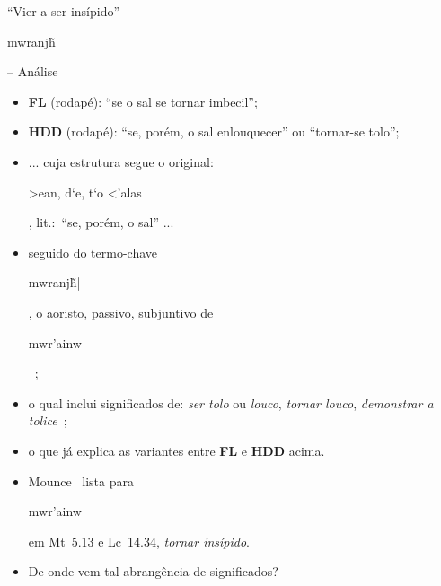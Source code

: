 \documentclass[12pt,aspectratio=169]{beamer}
\newcommand{\YEL}[1]{{\textcolor{TXyel}{#1}}}
\newcommand{\GRE}[1]{{\textcolor{TXgre}{#1}}}
\newcommand{\CYA}[1]{{\textcolor{TXcya}{#1}}}
\newcommand{\MAG}[1]{{\textcolor{TXmag}{#1}}}
\newcommand{\BRI}[1]{{\textcolor{BSpbg}{#1}}}   %
\newcommand{\GRtxt}[1]{\begin{otherlanguage}{greek}{{#1}}\end{otherlanguage}}
\begin{document}
    \begin{frame}{\BRI{``Vier a ser insípido''} -- \BRI{\GRtxt{mwranj\~h|}} -- \BRI{Análise}}
        \begin{itemize}
            \item<1-> \BRI{\textbf{FL}} (rodapé): \MAG{``se o sal se tornar imbecil''};
                \\[\medskipamount]
            \item<2-> \BRI{\textbf{HDD}} (rodapé): \MAG{``se, porém, o sal enlouquecer''} ou
                \MAG{``tornar-se tolo''};
                \\[\medskipamount]
            \item<3-> ... cuja estrutura segue o original: \YEL{\GRtxt{>ean, d`e, t`o <'alas}},
                lit.:~\MAG{``se, porém, o sal''} ...
                \\[\medskipamount]
            \item<4-> seguido do termo-chave \YEL{\GRtxt{mwranj\~h|}}, o \GRE{aoristo},
                \GRE{passivo}, \GRE{subjuntivo} de
                \YEL{\GRtxt{mwr'ainw}}~\cite{2013-MounceWD-VidaNova,
                2007-FribergB+FribergT-VidaNova, 2009-MounceWD-Vida}; %
                \\[\medskipamount]
            \item<5-> o qual inclui significados de: \CYA{\textit{ser tolo} ou \textit{louco}},
                \CYA{\textit{tornar louco}}, \CYA{\textit{demonstrar a
                tolice}}~\cite{2013-MounceWD-VidaNova};
                \\[\medskipamount]
            \item<6-> o que já explica as variantes entre \BRI{\textbf{FL}} e \BRI{\textbf{HDD}}
                acima.
                \\[\medskipamount]
            \item<7-> \BRI{Mounce}~\cite{2013-MounceWD-VidaNova} lista para
                \YEL{\GRtxt{mwr'ainw}} em \BRI{Mt~5.13} e \BRI{Lc~14.34}, \CYA{\textit{tornar
                insípido}}.
                \\[\medskipamount]
            \item<8-> De onde vem tal abrangência de significados?
        \end{itemize}
    \end{frame}
\end{document}
